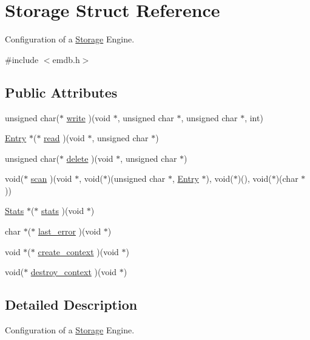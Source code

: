 \hypertarget{struct_storage}{}\section{Storage Struct Reference}
\label{struct_storage}


Configuration of a \hyperlink{struct_storage}{Storage} Engine.  




{\ttfamily \#include $<$emdb.\+h$>$}

\subsection*{Public Attributes}
\begin{DoxyCompactItemize}
\item 
unsigned char($\ast$ \hyperlink{struct_storage_a277c5f5a2ec42f4b66e83a95fb2b679c}{write} )(void $\ast$, unsigned char $\ast$, unsigned char $\ast$, int)
\item 
\hyperlink{struct_entry}{Entry} $\ast$($\ast$ \hyperlink{struct_storage_a6f8774ce9a6598367d47eaeafaf245d4}{read} )(void $\ast$, unsigned char $\ast$)
\item 
unsigned char($\ast$ \hyperlink{struct_storage_ae33c4c6b8e7dda3a854c3754ecbd22d9}{delete} )(void $\ast$, unsigned char $\ast$)
\item 
void($\ast$ \hyperlink{struct_storage_a2d0db132a4fefd7d3da72d2b27c2e98a}{scan} )(void $\ast$, void($\ast$)(unsigned char $\ast$, \hyperlink{struct_entry}{Entry} $\ast$), void($\ast$)(), void($\ast$)(char $\ast$))
\item 
\hyperlink{struct_stats}{Stats} $\ast$($\ast$ \hyperlink{struct_storage_a6642751e068c1e64f8b65703a8bc51a0}{stats} )(void $\ast$)
\item 
char $\ast$($\ast$ \hyperlink{struct_storage_a32909539bbc234d20b4bb0a51c575c9c}{last\+\_\+error} )(void $\ast$)
\item 
void $\ast$($\ast$ \hyperlink{struct_storage_a96d6e9b9bfd5b4943eb9660ca2293447}{create\+\_\+context} )(void $\ast$)
\item 
void($\ast$ \hyperlink{struct_storage_af425b1971a9fcfed315e6aec547df8da}{destroy\+\_\+context} )(void $\ast$)
\end{DoxyCompactItemize}


\subsection{Detailed Description}
Configuration of a \hyperlink{struct_storage}{Storage} Engine. 

